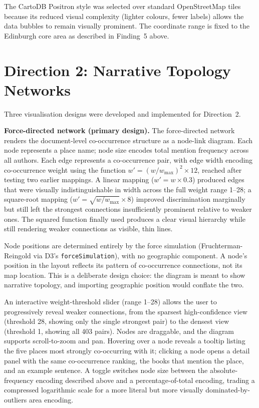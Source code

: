 \documentclass[logo,msc]{infthesis}
\begin{document}
The CartoDB Positron style was selected over standard OpenStreetMap tiles because its reduced visual complexity (lighter colours, fewer labels) allows the data bubbles to remain visually prominent. The coordinate range is fixed to the Edinburgh core area as described in Finding~5 above.
 
\section{Direction 2: Narrative Topology Networks}
 
Three visualisation designs were developed and implemented for Direction~2.
 
\textbf{Force-directed network (primary design).} The force-directed network renders the document-level co-occurrence structure as a node-link diagram. Each node represents a place name; node size encodes total mention frequency across all authors. Each edge represents a co-occurrence pair, with edge width encoding co-occurrence weight using the function $w' = (w / w_{\max})^2 \times 12$, reached after testing two earlier mappings. A linear mapping ($w' = w \times 0.3$) produced edges that were visually indistinguishable in width across the full weight range 1--28; a square-root mapping ($w' = \sqrt{w/w_{\max}} \times 8$) improved discrimination marginally but still left the strongest connections insufficiently prominent relative to weaker ones. The squared function finally used produces a clear visual hierarchy while still rendering weaker connections as visible, thin lines.
 
Node positions are determined entirely by the force simulation (Fruchterman-Reingold via D3's \texttt{forceSimulation}), with no geographic component. A node's position in the layout reflects its pattern of co-occurrence connections, not its map location. This is a deliberate design choice: the diagram is meant to show narrative topology, and importing geographic position would conflate the two.
 
An interactive weight-threshold slider (range 1--28) allows the user to progressively reveal weaker connections, from the sparsest high-confidence view (threshold 28, showing only the single strongest pair) to the densest view (threshold 1, showing all 403 pairs). Nodes are draggable, and the diagram supports scroll-to-zoom and pan. Hovering over a node reveals a tooltip listing the five places most strongly co-occurring with it; clicking a node opens a detail panel with the same co-occurrence ranking, the books that mention the place, and an example sentence. A toggle switches node size between the absolute-frequency encoding described above and a percentage-of-total encoding, trading a compressed logarithmic scale for a more literal but more visually dominated-by-outliers area encoding.
 
\end{document}
